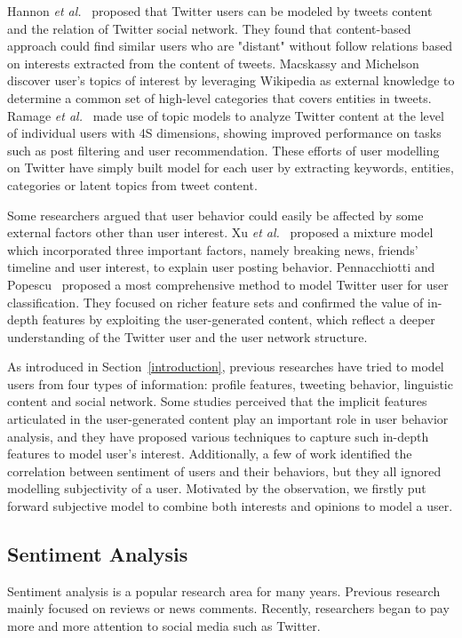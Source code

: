 \documentclass{acm_proc_article-sp}
\begin{document}
Hannon \emph{et al.}~\cite{hannon2010recommending} proposed that Twitter users can be modeled by tweets content and the relation of Twitter social network.
They found that content-based approach could find similar users who are "distant" without follow relations based on interests extracted from the content of tweets. 
Macskassy and Michelson~\cite{macskassy2011people} discover user's topics of interest by leveraging Wikipedia as external knowledge to determine a common set of high-level categories that covers entities in tweets. 
Ramage \emph{et al.}~\cite{ramage10microblogs} made use of topic models to analyze Twitter content at the level of individual users with 4S dimensions, showing improved performance on tasks such as post filtering and user recommendation. 
These efforts of user modelling on Twitter have simply built model for each user by extracting keywords, entities, categories or latent topics from tweet content. 

Some researchers argued that user behavior could easily be affected by some external factors other than user interest.
Xu \emph{et al.}~\cite{xu2012modeling} proposed a mixture model which incorporated three important factors, namely breaking news, friends' timeline and user interest, to explain user posting behavior.
Pennacchiotti and Popescu~\cite{pennacchiotti2011machine} proposed a most comprehensive method to model Twitter user for user classification. They focused on richer feature sets and confirmed the value of in-depth features by exploiting the user-generated content, which reflect a deeper understanding of the Twitter user and the user network structure.

As introduced in Section~\ref{introduction}, previous researches have tried to model users from four types of information: profile features, tweeting behavior, linguistic content and social network. 
Some studies perceived that the implicit features articulated in the user-generated content play an important role in user behavior analysis, and they have proposed various techniques to capture such in-depth features to model user's interest. 
Additionally, a few of work identified the correlation between sentiment of users and their behaviors, but they all ignored modelling subjectivity of a user.
Motivated by the observation, we firstly put forward subjective model to combine both interests and opinions to model a user.

\subsection{Sentiment Analysis}
Sentiment analysis is a popular research area for many years. Previous research mainly focused on reviews or news comments. 
Recently, researchers began to pay more and more attention to social media such as Twitter.
 
\end{document}
